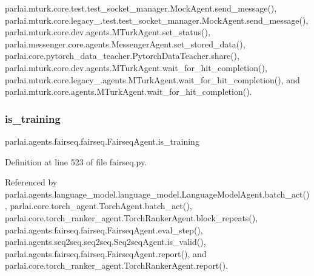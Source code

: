 parlai.\+mturk.\+core.\+test.\+test\+\_\+socket\+\_\+manager.\+Mock\+Agent.\+send\+\_\+message(), parlai.\+mturk.\+core.\+legacy\+\_.\+test.\+test\+\_\+socket\+\_\+manager.\+Mock\+Agent.\+send\+\_\+message(), parlai.\+mturk.\+core.\+dev.\+agents.\+M\+Turk\+Agent.\+set\+\_\+status(), parlai.\+messenger.\+core.\+agents.\+Messenger\+Agent.\+set\+\_\+stored\+\_\+data(), parlai.\+core.\+pytorch\+\_\+data\+\_\+teacher.\+Pytorch\+Data\+Teacher.\+share(), parlai.\+mturk.\+core.\+dev.\+agents.\+M\+Turk\+Agent.\+wait\+\_\+for\+\_\+hit\+\_\+completion(), parlai.\+mturk.\+core.\+legacy\+\_.\+agents.\+M\+Turk\+Agent.\+wait\+\_\+for\+\_\+hit\+\_\+completion(), and parlai.\+mturk.\+core.\+agents.\+M\+Turk\+Agent.\+wait\+\_\+for\+\_\+hit\+\_\+completion().

\mbox{\label{classparlai_1_1agents_1_1fairseq_1_1fairseq_1_1FairseqAgent_a5c6b4065ff551fb51e119d4c69dfb1cd}} 
\subsubsection{\texorpdfstring{is\+\_\+training}{is\_training}}
{\footnotesize\ttfamily parlai.\+agents.\+fairseq.\+fairseq.\+Fairseq\+Agent.\+is\+\_\+training}



Definition at line 523 of file fairseq.\+py.



Referenced by parlai.\+agents.\+language\+\_\+model.\+language\+\_\+model.\+Language\+Model\+Agent.\+batch\+\_\+act(), parlai.\+core.\+torch\+\_\+agent.\+Torch\+Agent.\+batch\+\_\+act(), parlai.\+core.\+torch\+\_\+ranker\+\_\+agent.\+Torch\+Ranker\+Agent.\+block\+\_\+repeats(), parlai.\+agents.\+fairseq.\+fairseq.\+Fairseq\+Agent.\+eval\+\_\+step(), parlai.\+agents.\+seq2seq.\+seq2seq.\+Seq2seq\+Agent.\+is\+\_\+valid(), parlai.\+agents.\+fairseq.\+fairseq.\+Fairseq\+Agent.\+report(), and parlai.\+core.\+torch\+\_\+ranker\+\_\+agent.\+Torch\+Ranker\+Agent.\+report().

\mbox{\label{classparlai_1_1agents_1_1fairseq_1_1fairseq_1_1FairseqAgent_ac675e98e191e3d2eb2128d0ea939e80d}} 

